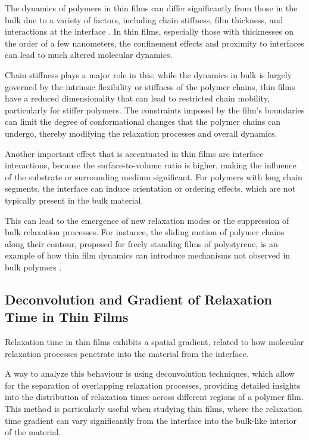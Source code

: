 The dynamics of polymers in thin films can differ significantly from those in the bulk due to a variety of factors, including chain stiffness, film thickness, and interactions at the interface \cite{LI2021101431}. In thin films, especially those with thicknesses on the order of a few nanometers, the confinement effects and proximity to interfaces can lead to much altered molecular dynamics.

Chain stiffness plays a major role in this: while the dynamics in bulk is largely governed by the intrinsic flexibility or stiffness of the polymer chains, thin films have a reduced dimensionality that can lead to restricted chain mobility, particularly for stiffer polymers. The constraints imposed by the film's boundaries can limit the degree of conformational changes that the polymer chains can undergo, thereby modifying the relaxation processes and overall dynamics.

Another important effect that is accentuated in thin films are interface interactions, because the surface-to-volume ratio is higher, making the influence of the substrate or surrounding medium significant. For polymers with long chain segments, the interface can induce orientation or ordering effects, which are not typically present in the bulk material. %

This can lead to the emergence of new relaxation modes or the suppression of bulk relaxation processes. For instance, the sliding motion of polymer chains along their contour, proposed for freely standing films of polystyrene, is an example of how thin film dynamics can introduce mechanisms not observed in bulk polymers \cite{winkler2021}.


\subsection{Deconvolution and Gradient of Relaxation Time in Thin Films}

Relaxation time in thin films exhibits a spatial gradient, related to how molecular relaxation processes penetrate into the material from the interface.

A way to analyze this behaviour is using deconvolution techniques, which allow for the separation of overlapping relaxation processes, providing detailed insights into the distribution of relaxation times across different regions of a polymer film. This method is particularly useful when studying thin films, where the relaxation time gradient can vary significantly from the interface into the bulk-like interior of the material.


